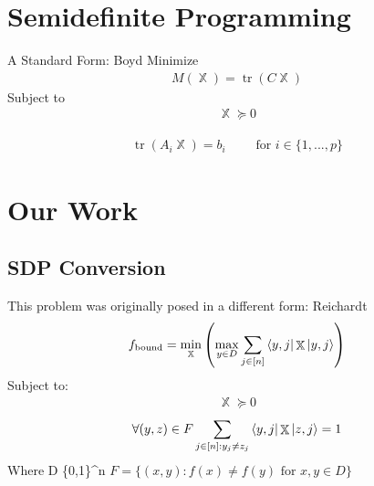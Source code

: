 \documentclass[12pt]{beamer}
\DeclareMathOperator{\X}{\mathbb{X}}		     %
\DeclareMathOperator{\tr}{\text{tr}}		     %
\begin{document}
\section{Semidefinite Programming}

\begin{frame}{A Standard Form: Boyd\cite{boyd2004convex}}
Minimize
\begin{align}\label{Eq:boyd_obj}
    M(\X) = \tr(C\X) \nonumber
\end{align}
Subject to
\begin{align} \label{Eq:boydSemi}
    \X \succcurlyeq 0   \nonumber
\end{align}

\begin{align} \label{Eq:boydTraceCon}
    \tr(A_i \X) = b_i  \text{$\qquad$ for $i \in \{1,...,p\}$}
    \nonumber
\end{align}
\end{frame}

\section{Our Work}

\subsection{SDP Conversion}
\begin{frame}{This problem was originally posed in a different
form: Reichardt \cite{reichardt2009span}}
\begin{align} \label{eq:reichardtObj} 
    f_{\text{bound}} = \min_{\X} \left( \max_{y \in D} \sum_{j \in [n]}
    \bra{y,j}\X\ket{y,j}  \right) \nonumber
\end{align}
Subject to:
\begin{align}\label{Eq:reichardtSemi}
    \X \succcurlyeq 0 \nonumber
\end{align}
\begin{align}\label{Eq:reichardtOffDiag}
    \forall (y,z) \in F \sum_{j \in [n]: y_j \ne z_j} 
    \bra{y,j} \X \ket{z, j} = 1 \nonumber
\end{align}
Where  D \subseteq \{0,1\}^n\newline
$F = \{(x,y) : f(x) \ne f(y) \text{ for } x,y \in D\}$
\end{frame}
\end{document}
